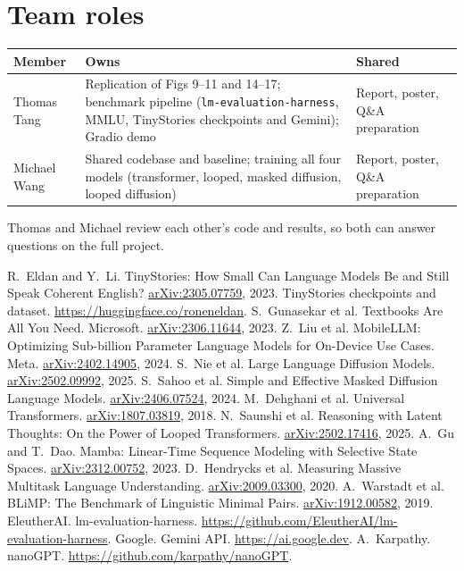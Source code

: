 \documentclass[11pt]{article}
\begin{document}
\section*{Team roles}

\begin{center}
\small
\begin{tabularx}{\linewidth}{>{\raggedright\arraybackslash}p{2.4cm} Y >{\raggedright\arraybackslash}p{3.2cm}}
\toprule
\textbf{Member} & \textbf{Owns} & \textbf{Shared} \\
\midrule
Thomas Tang & Replication of Figs 9--11 and 14--17; benchmark pipeline (\texttt{lm-evaluation-harness}, MMLU, TinyStories checkpoints and Gemini); Gradio demo & Report, poster, Q\&A preparation \\
Michael Wang & Shared codebase and baseline; training all four models (transformer, looped, masked diffusion, looped diffusion) & Report, poster, Q\&A preparation \\
\bottomrule
\end{tabularx}
\end{center}

Thomas and Michael review each other's code and results, so both can answer questions on the full project.

\begin{thebibliography}{99}
\small
{} R.~Eldan and Y.~Li. TinyStories: How Small Can Language Models Be and Still Speak Coherent English? \href{https://arxiv.org/abs/2305.07759}{arXiv:2305.07759}, 2023.
 TinyStories checkpoints and dataset. \url{https://huggingface.co/roneneldan}.
 S.~Gunasekar et al. Textbooks Are All You Need. Microsoft. \href{https://arxiv.org/abs/2306.11644}{arXiv:2306.11644}, 2023.
 Z.~Liu et al. MobileLLM: Optimizing Sub-billion Parameter Language Models for On-Device Use Cases. Meta. \href{https://arxiv.org/abs/2402.14905}{arXiv:2402.14905}, 2024.
 S.~Nie et al. Large Language Diffusion Models. \href{https://arxiv.org/abs/2502.09992}{arXiv:2502.09992}, 2025.
 S.~Sahoo et al. Simple and Effective Masked Diffusion Language Models. \href{https://arxiv.org/abs/2406.07524}{arXiv:2406.07524}, 2024.
 M.~Dehghani et al. Universal Transformers. \href{https://arxiv.org/abs/1807.03819}{arXiv:1807.03819}, 2018.
 N.~Saunshi et al. Reasoning with Latent Thoughts: On the Power of Looped Transformers. \href{https://arxiv.org/abs/2502.17416}{arXiv:2502.17416}, 2025.
 A.~Gu and T.~Dao. Mamba: Linear-Time Sequence Modeling with Selective State Spaces. \href{https://arxiv.org/abs/2312.00752}{arXiv:2312.00752}, 2023.
 D.~Hendrycks et al. Measuring Massive Multitask Language Understanding. \href{https://arxiv.org/abs/2009.03300}{arXiv:2009.03300}, 2020.
 A.~Warstadt et al. BLiMP: The Benchmark of Linguistic Minimal Pairs. \href{https://arxiv.org/abs/1912.00582}{arXiv:1912.00582}, 2019.
 EleutherAI. lm-evaluation-harness. \url{https://github.com/EleutherAI/lm-evaluation-harness}.
 Google. Gemini API. \url{https://ai.google.dev}.
 A.~Karpathy. nanoGPT. \url{https://github.com/karpathy/nanoGPT}.
\end{thebibliography}
\end{document}

